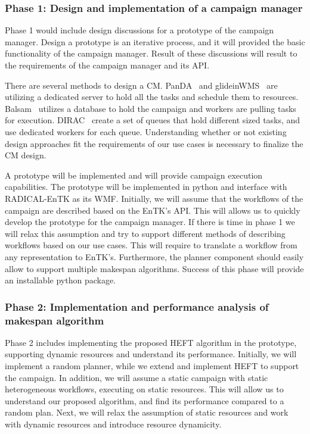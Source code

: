\subsubsection{Phase 1: Design and implementation of a campaign manager}
\label{obj1}

Phase 1 would include design discussions for a prototype of the campaign manager.
Design a prototype is an iterative process, and it will provided the basic functionality of the campaign manager.
Result of these discussions will result to the requirements of the campaign manager and its API.

There are several methods to design a CM.
PanDA~\cite{maeno2008panda} and glideinWMS~\cite{sfiligoi2008glidein} are utilizing a dedicated server to hold all the tasks and schedule them to resources.
Balsam~\cite{salim2019balsam} utilizes a database to hold the campaign and workers are pulling tasks for execution.
DIRAC~\cite{casajus2010dirac} create a set of queues that hold different sized tasks, and use dedicated workers for each queue.
Understanding whether or not existing design approaches fit the requirements of our use cases is necessary to finalize the CM design.

A prototype will be implemented and will provide campaign execution capabilities.
The prototype will be implemented in python and interface with RADICAL-EnTK as its WMF.
Initially, we will assume that the workflows of the campaign are described based on the EnTK's API.
This will allows us to quickly develop the prototype for the campaign manager.
If there is time in phase 1 we will relax this assumption and try to support different methods of describing workflows based on our use cases.
This will require to translate a workflow from any representation to EnTK's.
Furthermore, the planner component should easily allow to support multiple makespan algorithms.
Success of this phase will provide an installable python package. 


\subsubsection{Phase 2: Implementation and performance analysis of makespan algorithm}
\label{obj2}
Phase 2 includes implementing the proposed HEFT algorithm in the prototype, supporting dynamic resources and understand its performance.
Initially, we will implement a random planner, while we extend and implement HEFT to support the campaign.
In addition, we will assume a static campaign with static heterogeneous workflows, executing on static resources.
This will allow us to understand our proposed algorithm, and find its performance compared to a random plan.
Next, we will relax the assumption of static resources and work with dynamic resources and introduce resource dynamicity.

